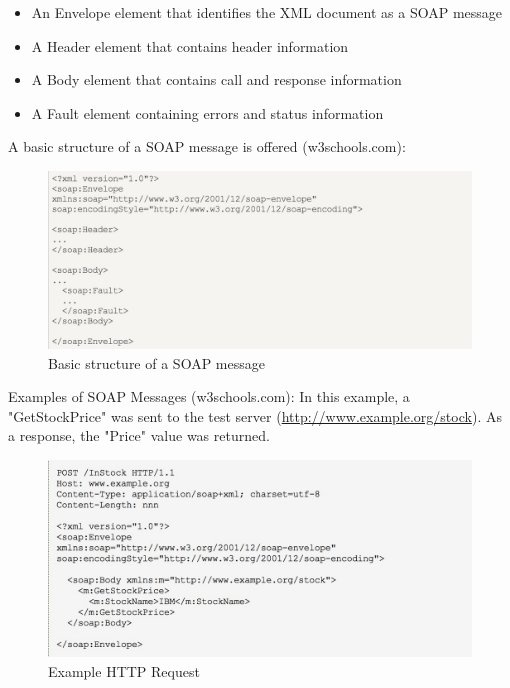 \documentclass[12pt,a4paper,oneside,titlepage]{article}
\begin{document}
\begin{itemize}
	\item An Envelope element that identifies the XML document as a SOAP message
	\item A Header element that contains header information
	\item A Body element that contains call and response information
	\item A Fault element containing errors and status information
\end{itemize}
A basic structure of a SOAP message is offered (w3schools.com): 

\begin{figure}[h!]
\centering
\includegraphics[scale=0.7]{img/soap-1.jpg}
\caption{Basic structure of a SOAP message \cite{soap1}}
\end{figure}

Examples of SOAP Messages (w3schools.com): In this example, a "GetStockPrice" was sent to the test server (\url{http://www.example.org/stock}). As a response, the "Price" value was returned.

\begin{figure}[h!]
\centering
\includegraphics[scale=0.7]{img/soap-2.jpg}
\caption{Example HTTP Request}
\end{figure}
\end{document}
